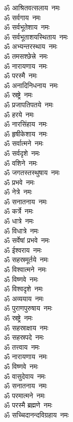 \begin{multicols}{2}
\begin{flushleft}
ॐ आश्रितवत्सलाय~नमः\\
ॐ सर्वगाय~नमः\\
ॐ सर्वभूतेशाय~नमः\\
ॐ सर्वभूताशयस्थिताय~नमः\\
ॐ अभ्यन्तरस्थाय~नमः\\
ॐ तमसश्छेत्त्रे~नमः\\
ॐ नारायणाय~नमः\\
ॐ परस्मै~नमः\\
ॐ अनादिनिधनाय~नमः\\
ॐ स्रष्ट्रे~नमः\hfill{}\\
ॐ प्रजापतिपतये~नमः\\
ॐ हरये~नमः\\
ॐ नारसिंहाय~नमः\\
ॐ हृषीकेशाय~नमः\\
ॐ सर्वात्मने~नमः\\
ॐ सर्वदृशे~नमः\\
ॐ वशिने~नमः\\
ॐ जगतस्तस्थुषाय~नमः\\
ॐ प्रभवे~नमः\\
ॐ नेत्रे~नमः\hfill{}\\
ॐ सनातनाय~नमः\\
ॐ कर्त्रे~नमः\\
ॐ धात्रे~नमः\\
ॐ विधात्रे~नमः\\
ॐ सर्वेषां प्रभवे~नमः\\
ॐ ईश्वराय~नमः\\
ॐ सहस्रमूर्तये~नमः\\
ॐ विश्वात्मने~नमः\\
ॐ विष्णवे~नमः\\
ॐ विश्वदृशे~नमः\hfill{}\\
ॐ अव्ययाय~नमः\\
ॐ पुराणपुरुषाय~नमः\\
ॐ स्रष्ट्रे~नमः\\
ॐ सहस्राक्षाय~नमः\\
ॐ सहस्रपदे~नमः\\
ॐ तत्त्वाय~नमः\\
ॐ नारायणाय~नमः\\
ॐ विष्णवे~नमः\\
ॐ वासुदेवाय~नमः\\
ॐ सनातनाय~नमः\hfill{}\\
ॐ परमात्मने~नमः\\
ॐ परस्मै ब्रह्मणे~नमः\\
ॐ सच्चिदानन्दविग्रहाय~नमः\\

\end{flushleft}
\end{multicols}
